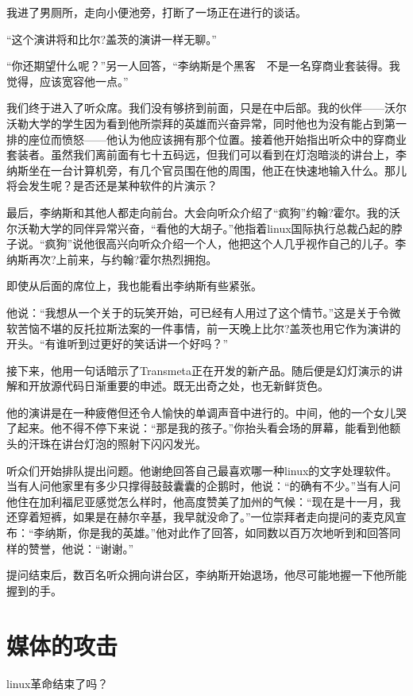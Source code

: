 我进了男厕所，走向小便池旁，打断了一场正在进行的谈话。

“这个演讲将和比尔?盖茨的演讲一样无聊。”

“你还期望什么呢？”另一人回答，“李纳斯是个黑客　不是一名穿商业套装得。我觉得，应该宽容他一点。”

我们终于进入了听众席。我们没有够挤到前面，只是在中后部。我的伙伴——沃尔沃勒大学的学生因为看到他所崇拜的英雄而兴奋异常，同时他也为没有能占到第一排的座位而愤怒——他认为他应该拥有那个位置。接着他开始指出听众中的穿商业套装者。虽然我们离前面有七十五码远，但我们可以看到在灯泡暗淡的讲台上，李纳斯坐在一台计算机旁，有几个官员围在他的周围，他正在快速地输入什么。那儿将会发生呢？是否还是某种软件的片演示？

最后，李纳斯和其他人都走向前台。大会向听众介绍了“疯狗”约翰?霍尔。我的沃尔沃勒大学的同伴异常兴奋，“看他的大胡子。”他指着linux国际执行总裁凸起的脖子说。“疯狗”说他很高兴向听众介绍一个人，他把这个人几乎视作自己的儿子。李纳斯再次?上前来，与约翰?霍尔热烈拥抱。

即使从后面的席位上，我也能看出李纳斯有些紧张。

他说：“我想从一个关于的玩笑开始，可已经有人用过了这个情节。”这是关于令微软苦恼不堪的反托拉斯法案的一件事情，前一天晚上比尔?盖茨也用它作为演讲的开头。“有谁听到过更好的笑话讲一个好吗？”

接下来，他用一句话暗示了Transmeta正在开发的新产品。随后便是幻灯演示的讲解和开放源代码日渐重要的申述。既无出奇之处，也无新鲜货色。

他的演讲是在一种疲倦但还令人愉快的单调声音中进行的。中间，他的一个女儿哭了起来。他不得不停下来说：“那是我的孩子。”你抬头看会场的屏幕，能看到他额头的汗珠在讲台灯泡的照射下闪闪发光。

听众们开始排队提出问题。他谢绝回答自己最喜欢哪一种linux的文字处理软件。当有人问他家里有多少只撑得鼓鼓囊囊的企鹅时，他说：“的确有不少。”当有人问他住在加利福尼亚感觉怎么样时，他高度赞美了加州的气候：“现在是十一月，我还穿着短裤，如果是在赫尔辛基，我早就没命了。”一位崇拜者走向提问的麦克风宣布：“李纳斯，你是我的英雄。”他对此作了回答，如同数以百万次地听到和回答同样的赞誉，他说：“谢谢。”

提问结束后，数百名听众拥向讲台区，李纳斯开始退场，他尽可能地握一下他所能握到的手。

 
\section{媒体的攻击}

 

linux革命结束了吗？

